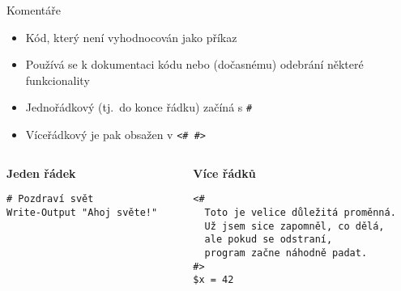 \documentclass[main.tex]{subfiles}
\begin{document}
\begin{frame}[fragile]{Komentáře}
   \begin{itemize}
    \item Kód, který není vyhodnocován jako příkaz
    \item Používá se k dokumentaci kódu nebo (dočasnému) odebrání některé funkcionality
    \item Jednořádkový (tj.\ do konce řádku) začíná s \texttt{\textit{\#}}
    \item Víceřádkový je pak obsažen v \texttt{\textit{\textless\# \#\textgreater}}
  \end{itemize}
  \vspace{5mm}
  \begin{columns}[t]
    \begin{column}{0.42\textwidth}
     \textbf{Jeden řádek}
     \begin{verbatim}
# Pozdraví svět
Write-Output "Ahoj světe!"
     \end{verbatim}
    \end{column}
    \begin{column}{0.58\textwidth}
      \textbf{Více řádků}
     \begin{verbatim}
<#
  Toto je velice důležitá proměnná.
  Už jsem sice zapomněl, co dělá,
  ale pokud se odstraní,
  program začne náhodně padat.
#>
$x = 42
      \end{verbatim}
    \end{column}
  \end{columns}
\end{frame}
\end{document}

